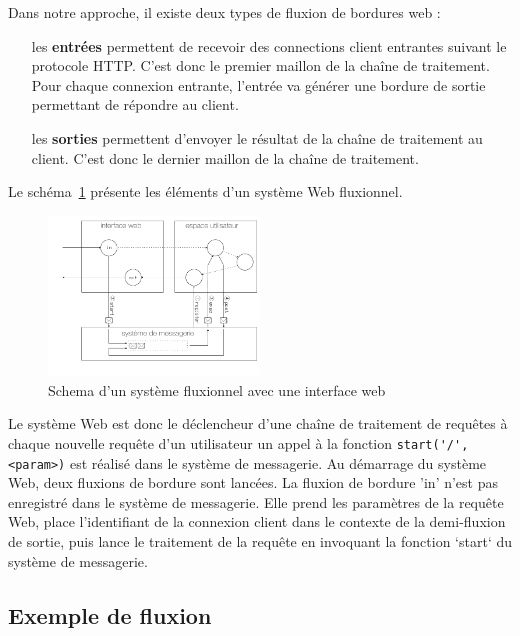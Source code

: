 Dans notre approche, il existe deux types de fluxion de bordures web :

\begin{itemize}
	\item[les \textbf{entrées}]
    permettent de recevoir des connections client entrantes suivant le protocole HTTP.
    C'est donc le premier maillon de la chaîne de traitement.
    Pour chaque connexion entrante, l'entrée va générer une bordure de sortie permettant de répondre au client.
	\item[les \textbf{sorties}]
    permettent d'envoyer le résultat de la chaîne de traitement au client.
    C'est donc le dernier maillon de la chaîne de traitement.
\end{itemize}


Le schéma~\ref{fig:schemaweb} présente les éléments d'un système Web fluxionnel.

\begin{figure}[h!]
	\includegraphics[width=0.5\textwidth]{schema-web.pdf}
	\caption{Schema d'un système fluxionnel avec une interface web}
	\label{fig:schemaweb}
\end{figure}

Le système Web est donc le déclencheur d'une chaîne de traitement de requêtes à chaque nouvelle requête d'un utilisateur un appel à la fonction \lstinline|start('/', <param>)| est réalisé dans le système de messagerie.
Au démarrage du système Web, deux fluxions de bordure sont lancées.
La fluxion de bordure 'in' n'est pas enregistré dans le système de messagerie.
Elle prend les paramètres de la requête Web, place l'identifiant de la connexion client dans le contexte de la demi-fluxion de sortie, puis lance le traitement de la requête en invoquant la fonction `start` du système de messagerie.

\subsection{Exemple de fluxion}

\TODO{}






